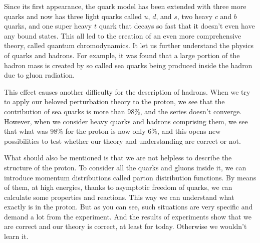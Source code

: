 \documentclass[a4paper, 12pt]{article}
\begin{document}
Since its first appearance, the quark model has been extended 
with three more quarks and now has three light quarks called 
$u$, $d$, and $s$, two heavy $c$ and $b$ quarks, and one 
super heavy $t$ quark that decays so fast that it doesn't even 
have any bound states. This all led to the creation of an even 
more comprehensive theory, called quantum chromodynamics. It 
let us further understand the physics of quarks and hadrons. 
For example, it was found that a large portion of the hadron 
mass is created by so called sea quarks being produced inside 
the hadron due to gluon radiation.

This effect causes another difficulty for the description of 
hadrons. When we try to apply our beloved perturbation theory 
to the proton, we see that the contribution of sea quarks is 
more than 98\%, and the series doesn't converge. However, when 
we consider heavy quarks and hadrons comprising them, we see 
that what was 98\% for the proton is now only 6\%, and this 
opens new possibilities to test whether our theory and 
understanding are correct or not.

What should also be mentioned is that we are not helpless to 
describe the structure of the proton. To consider all the 
quarks and gluons inside it, we can introduce momentum 
distributions called parton distribution functions. By means 
of them, at high energies, thanks to asymptotic freedom of 
quarks, we can calculate some properties and reactions. This 
way we can understand what exactly is in the proton. But as 
you can see, such situations are very specific and demand 
a lot from the experiment. And the results of experiments show 
that we are correct and our theory is correct, at least for 
today. Otherwise we wouldn't learn it.
\end{document}
